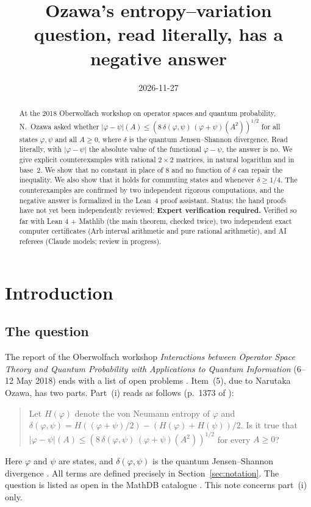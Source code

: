 \documentclass[11pt]{amsart}
\title[Ozawa's entropy--variation question]{Ozawa's entropy--variation question, read literally, has a negative answer}
\date{2026-11-27}
\theoremstyle{definition}\newtheorem{definition}[theorem]{Definition}
\theoremstyle{remark}\newtheorem{remark}[theorem]{Remark}
\newcommand{\abs}[1]{\lvert #1\rvert}
\begin{document}
\begin{abstract}
At the 2018 Oberwolfach workshop on operator spaces and quantum probability, N.~Ozawa asked whether \(\abs{\varphi-\psi}(A)\le(8\,\delta(\varphi,\psi)\,(\varphi+\psi)(A^2))^{1/2}\) for all states \(\varphi,\psi\) and all \(A\ge0\), where \(\delta\) is the quantum Jensen--Shannon divergence. Read literally, with \(\abs{\varphi-\psi}\) the absolute value of the functional \(\varphi-\psi\), the answer is no. We give explicit counterexamples with rational \(2\times2\) matrices, in natural logarithm and in base~2. We show that no constant in place of \(8\) and no function of \(\delta\) can repair the inequality. We also show that it holds for commuting states and whenever \(\delta\ge1/4\). The counterexamples are confirmed by two independent rigorous computations, and the negative answer is formalized in the Lean~4 proof assistant. Status: the hand proofs have not yet been independently reviewed;  \textbf{Expert verification required.} Verified so far with Lean 4 + Mathlib (the main theorem, checked twice), two independent exact computer certificates (Arb interval arithmetic and pure rational arithmetic), and AI referees (Claude models; review in progress).
\end{abstract}

\maketitle

\section{Introduction}

\subsection{The question}
The report of the Oberwolfach workshop \emph{Interactions between Operator Space Theory and Quantum Probability with Applications to Quantum Information} (6--12 May 2018) ends with a list of open problems \cite{owr18}. Item~(5), due to Narutaka Ozawa, has two parts. Part~(i) reads as follows (p.~1373 of \cite{owr18}):
\begin{quote}
Let \(H(\varphi)\) denote the von Neumann entropy of \(\varphi\) and
\(\delta(\varphi,\psi)=H((\varphi+\psi)/2)-(H(\varphi)+H(\psi))/2\).
Is it true that \(\abs{\varphi-\psi}(A)\le(8\,\delta(\varphi,\psi)\,(\varphi+\psi)(A^2))^{1/2}\) for every \(A\ge0\)?
\end{quote}
Here \(\varphi\) and \(\psi\) are states, and \(\delta(\varphi,\psi)\) is the quantum Jensen--Shannon divergence \cite{bh09}. All terms are defined precisely in Section~\ref{sec:notation}. The question is listed as open in the MathDB catalogue \cite{mathdb}. This note concerns part~(i) only.
\end{document}
